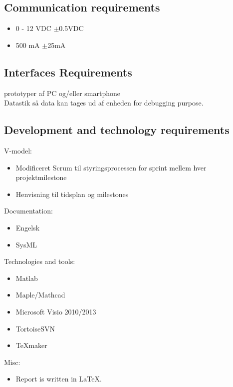 \subsection{Communication requirements}
\begin{itemize}
\item 0 - 12 VDC $\pm$0.5VDC
\item 500 mA $\pm$25mA
\end{itemize}

\subsection{Interfaces Requirements}
prototyper af PC og/eller smartphone\\
Datastik så data kan tages ud af enheden for debugging purpose.\\

\subsection{Development and technology requirements }
V-model:\\
\begin{itemize}
\item Modificeret Scrum til styringsprocessen for sprint mellem hver projektmilestone
\item Henvisning til tidsplan og milestones
\end{itemize}

Documentation:\\
\begin{itemize}
\item Engelsk
\item SysML
\end{itemize}

Technologies and tools:\\
\begin{itemize}
\item Matlab
\item Maple/Mathcad
\item Microsoft Visio 2010/2013
\item TortoiseSVN
\item TeXmaker
\end{itemize}

Misc:\\
\begin{itemize}
\item Report is written in LaTeX.
\end{itemize}